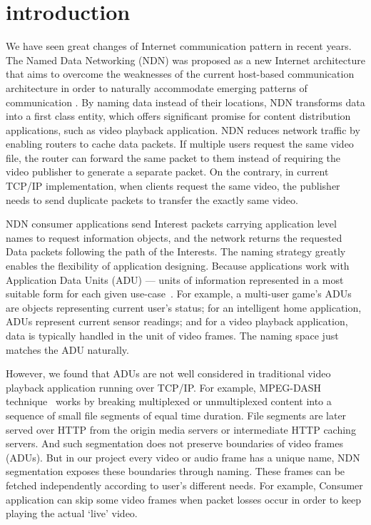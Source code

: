 \section{introduction} %
\label{sec:intro}
We have seen great changes of Internet communication pattern in recent years. The Named Data Networking (NDN) was proposed as a new Internet architecture that aims to overcome the weaknesses of the current host-based communication architecture in order to naturally accommodate emerging patterns of communication \cite{ndn-conext,ndn-tr,NDN-CCR14}. By naming data instead of their locations, NDN transforms data into a first class entity, which offers significant promise for content distribution applications, such as video playback application. NDN reduces network traffic by enabling routers to cache data packets. If multiple users request the same video file, the router can forward the same packet to them instead of requiring the video publisher to generate a separate packet. On the contrary, in current TCP/IP implementation, when clients request the same video, the publisher needs to send duplicate packets to transfer the exactly same video. 

NDN consumer applications send Interest packets carrying application level names to request information objects, and the network returns the requested Data packets following the path of the Interests. The naming strategy greatly enables the flexibility of application designing. Because applications work with Application Data Units (ADU) --- units of information represented in a most suitable form for each given use-case~\cite{Clark1990}. For example, a multi-user game's ADUs are objects representing current user's status; for an intelligent home application, ADUs represent current sensor readings; and for a video playback application, data is typically handled in the unit of video frames. The naming space just matches the ADU naturally. 

However, we found that ADUs are not well considered in traditional video playback application running over TCP/IP. For example, MPEG-DASH technique~\cite{stockhammer2011dynamic} works by breaking multiplexed or unmultiplexed content into a sequence of small file segments of equal time duration. File segments are later served over HTTP from the origin media servers or intermediate HTTP caching servers. And such segmentation does not preserve boundaries of video frames (ADUs). But in our project every video or audio frame has a unique name, NDN segmentation exposes these boundaries through naming. These frames can be fetched independently according to user's different needs. For example, Consumer application can skip some video frames when packet losses occur in order to keep playing the actual `live' video. 

